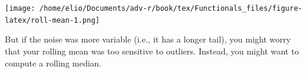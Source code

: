 \begin{Shaded}
\begin{Highlighting}[]
\StringTok{ }
\StringTok{ }\NormalTok{(}\NormalTok{, }

\StringTok{ }\OperatorTok{/}\StringTok{ }\NormalTok{)}
  \OperatorTok{+}\StringTok{ }\NormalTok{)}\OperatorTok{:}\NormalTok{(}\OperatorTok{-}\StringTok{ }\OperatorTok{+}\StringTok{ }\OperatorTok{+}\StringTok{ }\NormalTok{)) \{}
\StringTok{ }\NormalTok{(x[(i }\OperatorTok{-}\StringTok{ }\OperatorTok{:}\OperatorTok{+}\StringTok{ }\OperatorTok{-}\StringTok{ }\NormalTok{)])}
\NormalTok{  \}}
\NormalTok{\}}
\StringTok{ }\NormalTok{(}\NormalTok{, }\NormalTok{, } \NormalTok{) }\OperatorTok{+}\StringTok{ }\NormalTok{(}\NormalTok{)}
\NormalTok{(}\NormalTok{), } \NormalTok{, } \NormalTok{)}
\NormalTok{(}\NormalTok{), } \NormalTok{, } \NormalTok{)}
\end{Highlighting}
\end{Shaded}

\texttt{[image: /home/elio/Documents/adv-r/book/tex/Functionals\_files/figure-latex/roll-mean-1.png]}

But if the noise was more variable (i.e., it has a longer tail), you
might worry that your rolling mean was too sensitive to outliers.
Instead, you might want to compute a rolling median.

\begin{Shaded}
\begin{Highlighting}[]
\StringTok{ }\NormalTok{(}\NormalTok{, }\NormalTok{, } \NormalTok{) }\OperatorTok{+}\StringTok{ }\NormalTok{(}\NormalTok{, } \NormalTok{) }\OperatorTok{/}\StringTok{ }
\NormalTok{(}\NormalTok{), } \NormalTok{, } \NormalTok{)}
\end{Highlighting}
\end{Shaded}

